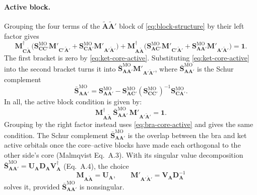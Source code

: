 \documentclass[aip,jcp,preprint]{revtex4-1}
\newcommand{\bvec}[1]{\mathbf{#1}}
\newcommand{\SMO}{\bvec{S}^{\mathrm{MO}}}
\begin{document}
\paragraph{Active block.}
Grouping the four terms of the $\tilde{\bvec{A}}\tilde{\bvec{A}}'$ block of \cref{eq:block-structure} by their left factor gives
\begin{equation}
 \bvec{M}_{\bvec{C}\tilde{\bvec{A}}}^\dagger
 \big(\SMO_{\bvec{C}\bvec{C}'}\bvec{M}'_{\bvec{C}'\tilde{\bvec{A}}'}
 + \SMO_{\bvec{C}\bvec{A}'}\bvec{M}'_{\bvec{A}'\tilde{\bvec{A}}'}\big)
 + \bvec{M}_{\bvec{A}\tilde{\bvec{A}}}^\dagger
 \big(\SMO_{\bvec{A}\bvec{C}'}\bvec{M}'_{\bvec{C}'\tilde{\bvec{A}}'}
 + \SMO_{\bvec{A}\bvec{A}'}\bvec{M}'_{\bvec{A}'\tilde{\bvec{A}}'}\big)
 = \bvec{1}.
 \label{eq:active-block}
\end{equation}
The first bracket is zero by \cref{eq:ket-core-active}.
Substituting \cref{eq:ket-core-active} into the second bracket turns it into $\bar{\bvec{S}}^{\mathrm{MO}}_{\bvec{A}\bvec{A}'}\bvec{M}'_{\bvec{A}'\tilde{\bvec{A}}'}$, where $\bar{\bvec{S}}^{\mathrm{MO}}_{\bvec{A}\bvec{A}'}$ is the Schur complement
\begin{equation}
 \bar{\bvec{S}}^{\mathrm{MO}}_{\bvec{A}\bvec{A}'} = \SMO_{\bvec{A}\bvec{A}'}
 - \SMO_{\bvec{A}\bvec{C}'}(\SMO_{\bvec{C}\bvec{C}'})^{-1}\SMO_{\bvec{C}\bvec{A}'}.
 \label{eq:schur}
\end{equation}
In all, the active block condition is given by:
\begin{equation}
 \bvec{M}_{\bvec{A}\tilde{\bvec{A}}}^\dagger\,
 \bar{\bvec{S}}^{\mathrm{MO}}_{\bvec{A}\bvec{A}'}\,
 \bvec{M}'_{\bvec{A}'\tilde{\bvec{A}}'} = \bvec{1}.
 \label{eq:active-cond}
\end{equation}
Grouping by the right factor instead uses \cref{eq:bra-core-active} and gives the same condition.
The Schur complement $\bar{\bvec{S}}^{\mathrm{MO}}_{\bvec{A}\bvec{A}'}$ is the overlap between the bra and ket active orbitals once the core--active blocks have made each orthogonal to the other side's core (Malmqvist Eq.~A.3).
With its singular value decomposition $\bar{\bvec{S}}^{\mathrm{MO}}_{\bvec{A}\bvec{A}'} = \bvec{U}_{\bvec{A}}\bvec{D}_{\bvec{A}}\bvec{V}_{\bvec{A}}^\dagger$ (Eq.~A.4), the choice
\begin{equation}
 \bvec{M}_{\bvec{A}\tilde{\bvec{A}}} = \bvec{U}_{\bvec{A}},
 \qquad
 \bvec{M}'_{\bvec{A}'\tilde{\bvec{A}}'} =
 \bvec{V}_{\bvec{A}}\bvec{D}_{\bvec{A}}^{-1}
 \label{eq:active-blocks}
\end{equation}
solves it, provided $\bar{\bvec{S}}^{\mathrm{MO}}_{\bvec{A}\bvec{A}'}$ is nonsingular.
\end{document}
